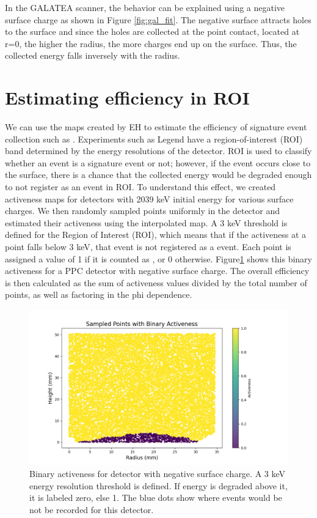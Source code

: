 In the GALATEA scanner, the behavior can be explained using a negative surface charge as shown in Figure \ref{fig:gal_fit}. The negative surface attracts holes to the surface and since the holes are collected at the point contact, located at r=0, the higher the radius, the more charges end up on the surface. Thus, the collected energy falls inversely with the radius.

\section{\label{res:2} Estimating efficiency in ROI}

We can use the maps created by EH to estimate the efficiency of signature event collection such as {\onbb}. Experiments such as Legend have a region-of-interest (ROI) band determined by the energy resolutions of the detector. ROI is used to classify whether an event is a signature event or not; however, if the event occurs close to the surface, there is a chance that the collected energy would be degraded enough to not register as an event in ROI. To understand this effect, we created activeness maps for detectors with 2039 keV initial energy for various surface charges. We then randomly sampled points uniformly in the detector and estimated their activeness using the interpolated map. A 3 keV threshold is defined for the Region of Interest (ROI), which means that if the activeness at a point falls below 3 keV, that event is not registered as a {\onbb} event. Each point is assigned a value of 1 if it is counted as {\onbb}, or 0 otherwise. Figure\ref{ch5_fig_binary_activenss} shows this binary activeness for a PPC detector with negative surface charge. The overall efficiency is then calculated as the sum of activeness values divided by the total number of points, as well as factoring in the phi dependence.

\begin{figure}%
\centering
\includegraphics[trim={1.5cm 0cm 6cm 1.77cm},clip,width=0.9\linewidth]{ch5/figs/bianry_act_ponama_1_-0.03.png}
\caption{Binary activeness for {\ponama} detector with negative surface charge. A $3$ keV energy resolution threshold is defined. If energy is degraded above it, it is labeled zero, else 1. The blue dots show where {\onbb} events would be not be recorded for this detector.}
\label{ch5_fig_binary_activenss}
\end{figure}

